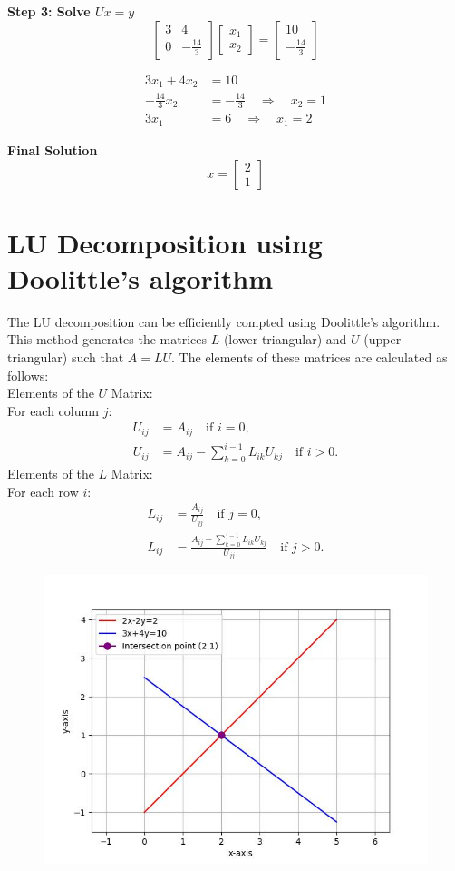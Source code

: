 \documentclass[journal]{IEEEtran}
\begin{document}
\textbf{Step 3: Solve \(Ux = y\)}
\[
\begin{bmatrix} 3 & 4 \\ 0 & -\frac{14}{3} \end{bmatrix} \begin{bmatrix} x_1 \\ x_2 \end{bmatrix} = \begin{bmatrix} 10 \\ -\frac{14}{3} \end{bmatrix} \tag{16}
\]

\begin{align}
    3x_1 + 4x_2 &= 10 \tag{17} \\
    -\frac{14}{3}x_2 &= -\frac{14}{3} \quad \Rightarrow \quad x_2 = 1 \tag{18} \\
    3x_1 &= 6 \quad \Rightarrow \quad x_1 = 2 \tag{19}
\end{align}

\textbf{Final Solution}
\[
x = \begin{bmatrix} 2 \\ 1 \end{bmatrix} \tag{20}
\]

\section*{LU Decomposition using Doolittle's algorithm}
The LU decomposition can be efficiently compted using Doolittle's algorithm. This method generates the matrices \( L \) (lower triangular) and \( U \) (upper triangular) such that \( A = LU \). The elements of these matrices are calculated as follows: \\
Elements of the \( U \) Matrix:  \\
For each column \( j \):
\begin{align}
	U_{ij} &= A_{ij} \quad \text{if } i = 0, \\
	U_{ij} &= A_{ij} - \sum_{k=0}^{i-1} L_{ik} U_{kj} \quad \text{if } i > 0.
\end{align}
Elements of the \( L \) Matrix: \\
For each row \( i \):
\begin{align}
	L_{ij} &= \frac{A_{ij}}{U_{jj}} \quad \text{if } j = 0, \\
	L_{ij} &= \frac{A_{ij} - \sum_{k=0}^{j-1} L_{ik} U_{kj}}{U_{jj}} \quad \text{if } j > 0.
\end{align}


\begin{figure}[h!]
   \centering
   \includegraphics[width=\columnwidth]{fig/combined_fig.jpg}
\end{figure}
\end{document}
